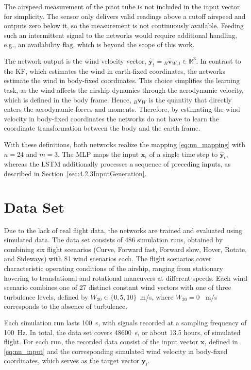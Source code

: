 The airspeed measurement of the pitot tube is not included in the input vector for simplicity. The sensor only delivers valid readings above a cutoff airspeed and outputs zero below it, so the measurement is not continuously available. Feeding such an intermittent signal to the networks would require additional handling, e.g., an availability flag, which is beyond the scope of this work. 

The network output is the wind velocity vector, $\hat{\bm{y}}_t = {}_B \hat{\bm{v}}_{W, t} \in \mathbb{R}^{3}$. In contrast to the KF, which estimates the wind in earth-fixed coordinates, the networks estimate the wind in body-fixed coordinates. This choice simplifies the learning task, as the wind affects the airship dynamics through the aerodynamic velocity, which is defined in the body frame. Hence, ${}_B \bm{v}_{W}$ is the quantity that directly enters the aerodynamic forces and moments. Therefore, by estimating the wind velocity in body-fixed coordinates the networks do not have to learn the coordinate transformation between the body and the earth frame.

With these definitions, both networks realize the mapping \eqref{eq:nn_mapping} with $n = 24$ and $m = 3$. The MLP maps the input $\bm{x}_t$ of a single time step to $\hat{\bm{y}}_t$, whereas the LSTM additionally processes a sequence of preceding inputs, as described in Section~\ref{sec:4.2.3InputGeneration}.





\section{Data Set}
\label{sec:4.2DataSet}

Due to the lack of real flight data, the networks are trained and evaluated using simulated data. The data set consists of 486 simulation runs, obtained by combining six flight scenarios (Curve, Forward fast, Forward slow, Hover, Rotate, and Sideways) with 81 wind scenarios each. The flight scenarios cover characteristic operating conditions of the airship, ranging from stationary hovering to translational and rotational maneuvers at different speeds.
Each wind scenario combines one of 27 distinct constant wind vectors with one of three turbulence levels, defined by $W_{20} \in \{0, 5, 10\}$\SI{}{m/s}, where $W_{20} = 0$ \SI{}{m/s} corresponds to the absence of turbulence.

Each simulation run lasts \SI{100}{\second}, with signals recorded at a sampling frequency of \SI{100}{\hertz}. In total, the data set covers \SI{48600}{\second}, or about 13.5 hours, of simulated flight. For each run, the recorded data consist of the input vector $\bm{x}_t$ defined in \eqref{eq:nn_input} and the corresponding simulated wind velocity in body-fixed coordinates, which serves as the target vector $\bm{y}_t$.





